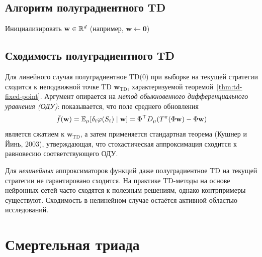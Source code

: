 \subsection{Алгоритм полуградиентного TD}

\begin{algorithm}[ht]
\caption{Полуградиентное TD(0) для оценивания стратегии}
\label{alg:semi-grad-td0}
\KwIn{Стратегия $\pi$, признаковое отображение $\varphi$, шаг $\alpha > 0$, дисконт $\gamma \in [0,1)$}
Инициализировать $\mathbf{w} \in \mathbb{R}^d$ (например, $\mathbf{w} \leftarrow \mathbf{0}$)\;
\end{algorithm}

\subsection{Сходимость полуградиентного TD}

Для линейного случая полуградиентное TD(0) при выборке на текущей стратегии сходится к неподвижной точке TD $\mathbf{w}_{\mathrm{TD}}$, характеризуемой теоремой~\ref{thm:td-fixed-point}.  Аргумент опирается на \emph{метод обыкновенного дифференциального уравнения (ОДУ)}: показывается, что поле среднего обновления
\[
\bar{f}(\mathbf{w}) = \operatorname{\mathbb{E}}_\mu[\delta_t \varphi(S_t) \mid \mathbf{w}]
= \Phi^\top D_\mu (T^\pi(\Phi\mathbf{w}) - \Phi\mathbf{w})
\]
является сжатием к $\mathbf{w}_{\mathrm{TD}}$, а затем применяется стандартная теорема (Кушнер и Йинь, 2003), утверждающая, что стохастическая аппроксимация сходится к равновесию соответствующего ОДУ.

Для \emph{нелинейных} аппроксиматоров функций даже полуградиентное TD на текущей стратегии не гарантировано сходится.  На практике TD-методы на основе нейронных сетей часто сходятся к полезным решениям, однако контрпримеры существуют.  Сходимость в нелинейном случае остаётся активной областью исследований.

\section{Смертельная триада}
\label{sec:deadly-triad}

